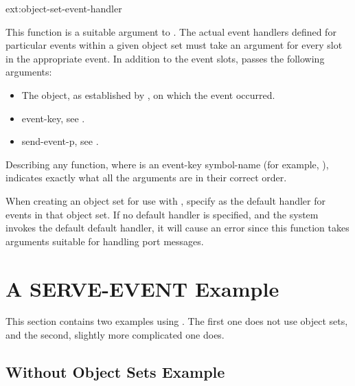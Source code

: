 \begin{defun}{ext:}{object-set-event-handler}{%
    }
  
  This function is a suitable argument to
  .  The actual event handlers
  defined for particular events within a given object set must take an
  argument for every slot in the appropriate event.  In addition to
  the event slots,  passes the
  following arguments:
  \begin{itemize}
  \item The object, as established by
    , on which the event occurred.
  \item event-key, see .
  \item send-event-p, see .
  \end{itemize}
  
  Describing any  function, where
   is an event-key symbol-name (for example,
  ), indicates exactly what all the
  arguments are in their correct order.

  
  When creating an object set for use with
  , specify
   as the default handler for
  events in that object set.  If no default handler is specified, and
  the system invokes the default default handler, it will cause an
  error since this function takes arguments suitable for handling port
  messages.
\end{defun}


\section{A SERVE-EVENT Example}

This section contains two examples using .  The first
one does not use object sets, and the second, slightly more complicated one
does.

\subsection{Without Object Sets Example}

